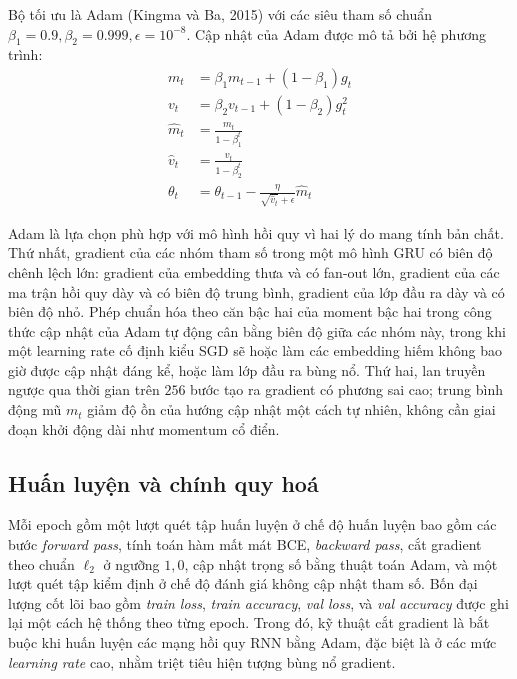 Bộ tối ưu là Adam (Kingma và Ba, 2015) với các siêu tham số chuẩn $\beta_1 = 0.9, \beta_2 = 0.999, \epsilon = 10^{-8}$. Cập nhật của Adam được mô tả bởi hệ phương trình:
\begin{align}
m_t &= \beta_1 m_{t-1} + (1 - \beta_1) g_t \\
v_t &= \beta_2 v_{t-1} + (1 - \beta_2) g_t^2 \\
\hat{m}_t &= \frac{m_t}{1 - \beta_1^t} \\
\hat{v}_t &= \frac{v_t}{1 - \beta_2^t} \\
\theta_t &= \theta_{t-1} - \frac{\eta}{\sqrt{\hat{v}_t} + \epsilon} \hat{m}_t
\end{align}

Adam là lựa chọn phù hợp với mô hình hồi quy vì hai lý do mang tính bản chất. Thứ nhất, gradient của các nhóm tham số trong một mô hình GRU có biên độ chênh lệch lớn: gradient của embedding thưa và có fan-out lớn, gradient của các ma trận hồi quy dày và có biên độ trung bình, gradient của lớp đầu ra dày và có biên độ nhỏ. Phép chuẩn hóa theo căn bậc hai của moment bậc hai trong công thức cập nhật của Adam tự động cân bằng biên độ giữa các nhóm này, trong khi một learning rate cố định kiểu SGD sẽ hoặc làm các embedding hiếm không bao giờ được cập nhật đáng kể, hoặc làm lớp đầu ra bùng nổ. Thứ hai, lan truyền ngược qua thời gian trên $256$ bước tạo ra gradient có phương sai cao; trung bình động mũ $m_t$ giảm độ ồn của hướng cập nhật một cách tự nhiên, không cần giai đoạn khởi động dài như momentum cổ điển.

\subsection{Huấn luyện và chính quy hoá}

Mỗi epoch gồm một lượt quét tập huấn luyện ở chế độ huấn luyện bao gồm các bước \textit{forward pass}, tính toán hàm mất mát BCE, \textit{backward pass}, cắt gradient theo chuẩn $\ell_2$ ở ngưỡng $1,0$, cập nhật trọng số bằng thuật toán Adam, và một lượt quét tập kiểm định ở chế độ đánh giá không cập nhật tham số. Bốn đại lượng cốt lõi bao gồm \textit{train loss}, \textit{train accuracy}, \textit{val loss}, và \textit{val accuracy} được ghi lại một cách hệ thống theo từng epoch. Trong đó, kỹ thuật cắt gradient là bắt buộc khi huấn luyện các mạng hồi quy RNN bằng Adam, đặc biệt là ở các mức \textit{learning rate} cao, nhằm triệt tiêu hiện tượng bùng nổ gradient.

